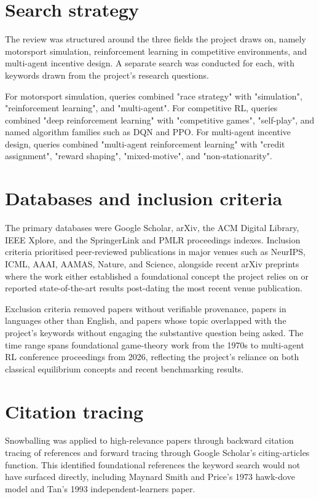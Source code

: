 \begin{appendices}
\section{Search strategy}

The review was structured around the three fields the project draws on, namely motorsport simulation, reinforcement learning in competitive environments, and multi-agent incentive design. A separate search was conducted for each, with keywords drawn from the project's research questions.

For motorsport simulation, queries combined "race strategy" with "simulation", "reinforcement learning", and "multi-agent". For competitive RL, queries combined "deep reinforcement learning" with "competitive games", "self-play", and named algorithm families such as DQN and PPO. For multi-agent incentive design, queries combined "multi-agent reinforcement learning" with "credit assignment", "reward shaping", "mixed-motive", and "non-stationarity".

\section{Databases and inclusion criteria}

The primary databases were Google Scholar, arXiv, the ACM Digital Library, IEEE Xplore, and the SpringerLink and PMLR proceedings indexes. Inclusion criteria prioritised peer-reviewed publications in major venues such as NeurIPS, ICML, AAAI, AAMAS, Nature, and Science, alongside recent arXiv preprints where the work either established a foundational concept the project relies on or reported state-of-the-art results post-dating the most recent venue publication.

Exclusion criteria removed papers without verifiable provenance, papers in languages other than English, and papers whose topic overlapped with the project's keywords without engaging the substantive question being asked. The time range spans foundational game-theory work from the 1970s to multi-agent RL conference proceedings from 2026, reflecting the project's reliance on both classical equilibrium concepts and recent benchmarking results.

\section{Citation tracing}

Snowballing was applied to high-relevance papers through backward citation tracing of references and forward tracing through Google Scholar's citing-articles function. This identified foundational references the keyword search would not have surfaced directly, including Maynard Smith and Price's 1973 hawk-dove model and Tan's 1993 independent-learners paper.


\end{appendices}
